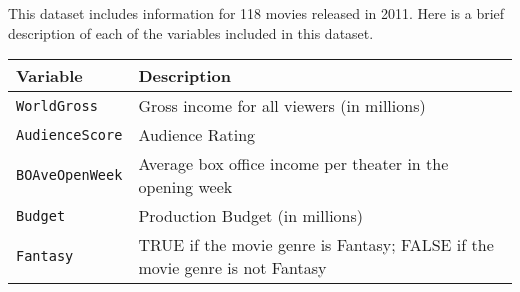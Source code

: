 \documentclass[]{article}
\begin{document}
This dataset includes information for 118 movies released in 2011. Here
is a brief description of each of the variables included in this
dataset.

\begin{longtable}[]{@{}ll@{}}
\toprule
\begin{minipage}[b]{0.25\columnwidth}\raggedright
Variable\strut
\end{minipage} & \begin{minipage}[b]{0.61\columnwidth}\raggedright
Description\strut
\end{minipage}\tabularnewline
\midrule
\endhead
\begin{minipage}[t]{0.25\columnwidth}\raggedright
\texttt{WorldGross}\strut
\end{minipage} & \begin{minipage}[t]{0.61\columnwidth}\raggedright
Gross income for all viewers (in millions)\strut
\end{minipage}\tabularnewline
\begin{minipage}[t]{0.25\columnwidth}\raggedright
\texttt{AudienceScore}\strut
\end{minipage} & \begin{minipage}[t]{0.61\columnwidth}\raggedright
Audience Rating\strut
\end{minipage}\tabularnewline
\begin{minipage}[t]{0.25\columnwidth}\raggedright
\texttt{BOAveOpenWeek}\strut
\end{minipage} & \begin{minipage}[t]{0.61\columnwidth}\raggedright
Average box office income per theater in the opening week\strut
\end{minipage}\tabularnewline
\begin{minipage}[t]{0.25\columnwidth}\raggedright
\texttt{Budget}\strut
\end{minipage} & \begin{minipage}[t]{0.61\columnwidth}\raggedright
Production Budget (in millions)\strut
\end{minipage}\tabularnewline
\begin{minipage}[t]{0.25\columnwidth}\raggedright
\texttt{Fantasy}\strut
\end{minipage} & \begin{minipage}[t]{0.61\columnwidth}\raggedright
TRUE if the movie genre is Fantasy; FALSE if the movie genre is not
Fantasy\strut
\end{minipage}\tabularnewline
\bottomrule
\end{longtable}
\end{document}
